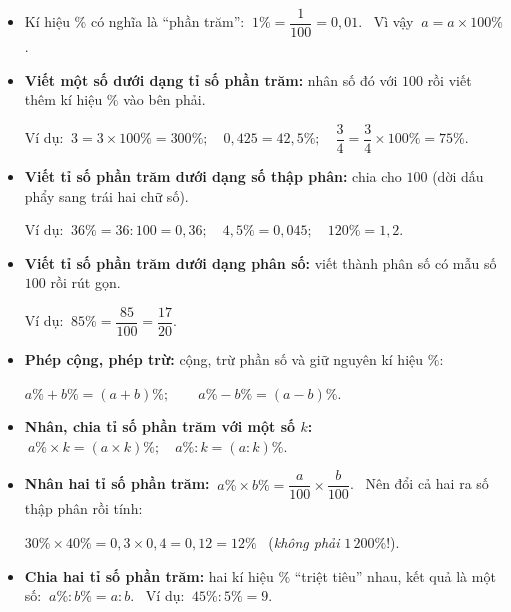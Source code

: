 \begin{knowbox}\begin{itemize}[leftmargin=1.4em,itemsep=3pt]
\item Kí hiệu $\%$ có nghĩa là ``phần trăm'': $\ 1\%=\dfrac1{100}=0{,}01$. \ Vì vậy $\ a=a\times100\%$.
\item \textbf{Viết một số dưới dạng tỉ số phần trăm:} nhân số đó với $100$ rồi viết thêm kí hiệu $\%$ vào bên phải.\par
Ví dụ: $\ 3=3\times100\%=300\%;\quad 0{,}425=42{,}5\%;\quad \dfrac34=\dfrac34\times100\%=75\%$.
\item \textbf{Viết tỉ số phần trăm dưới dạng số thập phân:} chia cho $100$ (dời dấu phẩy sang trái hai chữ số).\par
Ví dụ: $\ 36\%=36:100=0{,}36;\quad 4{,}5\%=0{,}045;\quad 120\%=1{,}2$.
\item \textbf{Viết tỉ số phần trăm dưới dạng phân số:} viết thành phân số có mẫu số $100$ rồi rút gọn.\par
Ví dụ: $\ 85\%=\dfrac{85}{100}=\dfrac{17}{20}$.
\end{itemize}
\end{knowbox}
\gap
{}
\begin{knowbox}\begin{itemize}[leftmargin=1.4em,itemsep=3pt]
\item \textbf{Phép cộng, phép trừ:} cộng, trừ phần số và giữ nguyên kí hiệu $\%$:\par
$a\%+b\%=(a+b)\%;\qquad a\%-b\%=(a-b)\%$.
\item \textbf{Nhân, chia tỉ số phần trăm với một số $k$:} $\ a\%\times k=(a\times k)\%;\quad a\%:k=(a:k)\%$.
\item \textbf{Nhân hai tỉ số phần trăm:} $\ a\%\times b\%=\dfrac a{100}\times\dfrac b{100}$. \ Nên đổi cả hai ra số thập phân rồi tính:\par
$30\%\times40\%=0{,}3\times0{,}4=0{,}12=12\%$ \ (\emph{không phải} $1\,200\%$!).
\item \textbf{Chia hai tỉ số phần trăm:} hai kí hiệu $\%$ ``triệt tiêu'' nhau, kết quả là một số: $\ a\%:b\%=a:b$. \ Ví dụ: $\ 45\%:5\%=9$.
\end{itemize}
\end{knowbox}
\gap
{}
